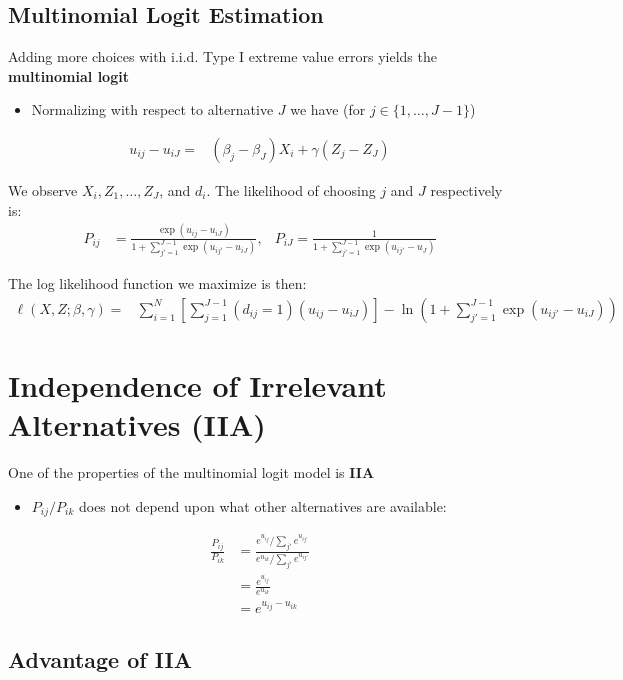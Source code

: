 \documentclass[11pt]{article}
\begin{document}
\subsection{Multinomial Logit Estimation}
\label{sec:org9c08fa4}

Adding more choices with i.i.d. Type I extreme value errors yields the \textbf{multinomial logit}

\begin{itemize}
\item Normalizing with respect to alternative \(J\) we have (for \(j\in\{1,\ldots,J-1\}\))
\end{itemize}
\begin{align}
u_{ij}-u_{iJ}=&(\beta_j-\beta_J)X_i+\gamma (Z_j-Z_{J})
\end{align}

We observe \(X_i, Z_1, \ldots, Z_J\), and \(d_i\). The likelihood of choosing \(j\) and \(J\) respectively is:
\begin{align}
P_{ij}&=\frac{\exp(u_{ij}-u_{iJ})}{1+\sum_{j'=1}^{J-1}\exp(u_{ij'}-u_{iJ})},&P_{iJ}=\frac{1}{1+\sum_{j'=1}^{J-1}\exp(u_{ij'}-u_J)}
\end{align}

The log likelihood function we maximize is then:
\begin{align}
\ell(X,Z;\beta,\gamma)=&\sum_{i=1}^N\left[\sum_{j=1}^{J-1}(d_{ij}=1)(u_{ij}-u_{iJ})\right]-\ln\left(1+\sum_{j'=1}^{J-1}\exp(u_{ij'}-u_{iJ})\right)
\end{align}

\section{Independence of Irrelevant Alternatives (IIA)}
\label{sec:orga522b04}

One of the properties of the multinomial logit model is \textbf{IIA}


\begin{itemize}
\item \(P_{ij}/P_{ik}\) does not depend upon what other alternatives are available:
\end{itemize}
\begin{align*}
\frac{P_{ij}}{P_{ik}}&=\frac{e^{u_{ij}}/\sum_{j'}e^{u_{ij'}}}{e^{u_{ik}}/\sum_{j'}e^{u_{ij'}}}\\
&=\frac{e^{u_{ij}}}{e^{u_{ik}}}\\
&=e^{u_{ij}-u_{ik}}
\end{align*}


\subsection{Advantage of IIA}
\label{sec:orgad53a5a}
\end{document}
